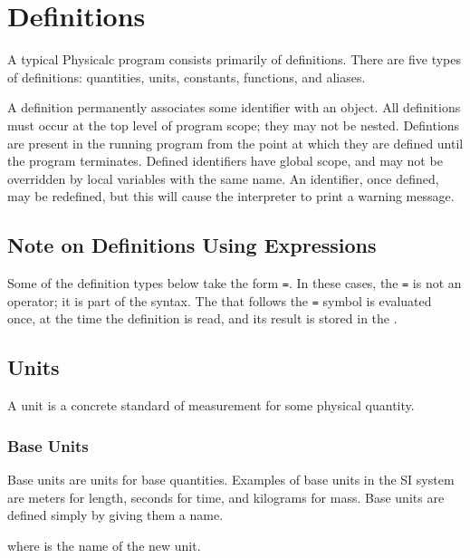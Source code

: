 \section{Definitions}
\label{definitions}

A typical Physicalc program consists primarily of definitions.  There
are five types of definitions: quantities, units, constants,
functions, and aliases.  

A definition permanently associates some identifier with an object.
All definitions must occur at the top level of program scope; they may
not be nested.  Defintions are present in the running program from the
point at which they are defined until the program terminates.  Defined
identifiers have global scope, and may not be overridden by local
variables with the same name.  An identifier, once defined, may be
redefined, but this will cause the interpreter to print a warning
message.

\subsection{Note on Definitions Using Expressions}

Some of the definition types below take the form \id{}\verb|=|\expr{}.
In these cases, the \verb|=| is not an operator; it is part of the
syntax.  The \expr{} that follows the \verb|=| symbol is evaluated
once, at the time the definition is read, and its result is stored in
the \id{}.


\subsection{Units}
\label{units}

A unit is a concrete standard of measurement for some physical
quantity.


\subsubsection{Base Units}

Base units are units for base quantities.  Examples of base units in
the SI system are meters for length, seconds for time, and kilograms
for mass.\cite{base-unit} Base units are defined simply by giving them
a name.

\begin{syntax}
 \id{}
\end{syntax}
where \id{} is the name of the new unit.


